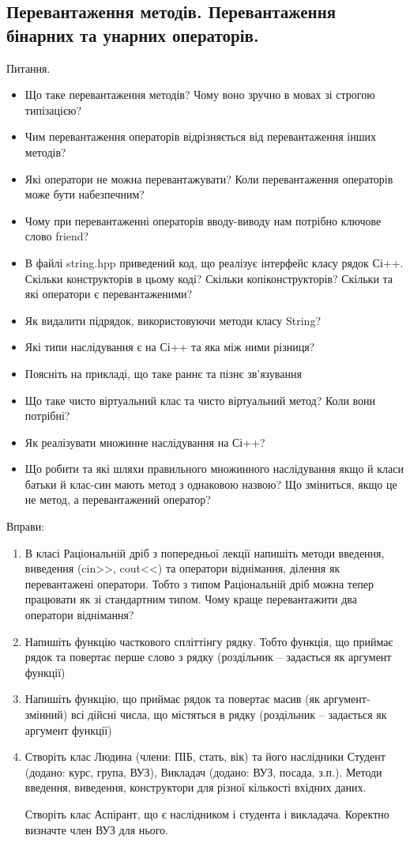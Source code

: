 \documentclass[]{article}
\begin{document}
\subsection {Перевантаження методів. Перевантаження бінарних та унарних
операторів.}

Питання.
\begin{itemize}
\item
Що таке перевантаження методів?
Чому воно зручно в мовах зі строгою типізацією?
\item
Чим перевантаження операторів відрізняється від перевантаження інших
методів?
\item
Які оператори не можна перевантажувати? Коли перевантаження операторів
може бути набезпечним?
\item
Чому при перевантаженні операторів вводу-виводу нам потрібно ключове
слово friend?
\item
В файлі string.hpp приведений код, що реалізує інтерфейс класу рядок
Сі++. Скільки конструкторів в цьому коді? Скільки копіконструкторів?
Скільки та які оператори є перевантаженими?
\item
Як видалити підрядок, використовуючи методи класу String?
\item
Які типи наслідування є на Сі++ та яка між ними різниця?
\item
Поясніть на прикладі, що таке раннє та пізнє зв'язування
\item
Що таке чисто віртуальний клас та чисто віртуальний метод? Коли вони
потрібні?
\item
Як реалізувати множинне наслідування на Сі++?
\item
Що робити та які шляхи правильного множинного наслідування якщо й класи
батьки й клас-син мають метод з однаковою назвою? Що зміниться, якщо це
не метод, а перевантажений оператор?
\end{itemize}

Вправи:
\begin{enumerate}
\item В класі Раціональній дріб з
попередньої лекції напишіть методи введення, виведення
(cin\textgreater{}\textgreater{}, cout\textless{}\textless{}) та
оператори віднімання, ділення як перевантажені оператори. Тобто з типом
Раціональній дріб можна тепер працювати як зі стандартним типом. Чому
краще перевантажити два оператори віднімання?

\item 
Напишіть функцію часткового
спліттінгу рядку. Тобто функція, що приймає рядок та повертає перше
слово з рядку (роздільник -- задається як аргумент функції)
\item
Напишіть функцію, що приймає рядок та повертає масив (як
аргумент-змінний) всі дійсні числа, що містяться в рядку (роздільник --
задається як аргумент функції)

\item
Створіть клас Людина (члени: ПІБ,
стать, вік) та його наслідники Студент (додано: курс, група, ВУЗ),
Викладач (додано: ВУЗ, посада, з.п.). Методи введення, виведення,
конструктори для різної кількості вхідних даних.

Створіть клас Аспірант, що є наслідником і студента і викладача.
Коректно визначте член ВУЗ для нього.
\end{enumerate}
\end{document}
